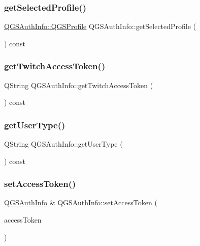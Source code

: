 \subsubsection{\texorpdfstring{get\+Selected\+Profile()}{getSelectedProfile()}}
{\footnotesize\ttfamily \mbox{\hyperlink{class_q_g_s_auth_info_1_1_q_g_s_profile}{Q\+G\+S\+Auth\+Info\+::\+Q\+G\+S\+Profile}} Q\+G\+S\+Auth\+Info\+::get\+Selected\+Profile (\begin{DoxyParamCaption}{ }\end{DoxyParamCaption}) const}

\mbox{\label{class_q_g_s_auth_info_abfb4440c71e2b0eb36039a5fd27041f4}} 
\subsubsection{\texorpdfstring{get\+Twitch\+Access\+Token()}{getTwitchAccessToken()}}
{\footnotesize\ttfamily Q\+String Q\+G\+S\+Auth\+Info\+::get\+Twitch\+Access\+Token (\begin{DoxyParamCaption}{ }\end{DoxyParamCaption}) const}

\mbox{\label{class_q_g_s_auth_info_a74584eceedefa53603e49b2ef2cca18f}} 
\subsubsection{\texorpdfstring{get\+User\+Type()}{getUserType()}}
{\footnotesize\ttfamily Q\+String Q\+G\+S\+Auth\+Info\+::get\+User\+Type (\begin{DoxyParamCaption}{ }\end{DoxyParamCaption}) const}

\mbox{\label{class_q_g_s_auth_info_af18cfedbaebaf6e54f4ea519442d1979}} 
\subsubsection{\texorpdfstring{set\+Access\+Token()}{setAccessToken()}}
{\footnotesize\ttfamily \mbox{\hyperlink{class_q_g_s_auth_info}{Q\+G\+S\+Auth\+Info}} \& Q\+G\+S\+Auth\+Info\+::set\+Access\+Token (\begin{DoxyParamCaption}\item[{const Q\+String \&}]{access\+Token }\end{DoxyParamCaption})}

